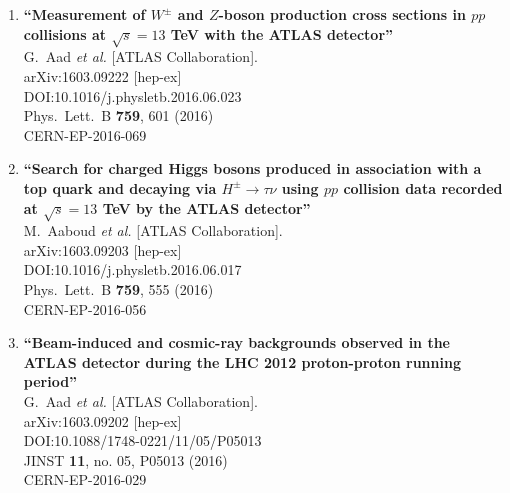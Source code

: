 \documentclass{article}
\begin{document}
\begin{enumerate}
\item%
{\bf ``Measurement of $W^{\pm}$ and $Z$-boson production cross sections in $pp$ collisions at $\sqrt{s}=13$ TeV with the ATLAS detector''}
  \\{}G.~Aad {\it et al.} [ATLAS Collaboration].
  \\{}arXiv:1603.09222 [hep-ex]
  \\{}DOI:10.1016/j.physletb.2016.06.023
  \\{}Phys.\ Lett.\ B {\bf 759}, 601 (2016)
  \\{}CERN-EP-2016-069
\item%
{\bf ``Search for charged Higgs bosons produced in association with a top quark and decaying via $H^{\pm} \rightarrow \tau\nu$ using $pp$ collision data recorded at $\sqrt{s} = 13$ TeV by the ATLAS detector''}
  \\{}M.~Aaboud {\it et al.} [ATLAS Collaboration].
  \\{}arXiv:1603.09203 [hep-ex]
  \\{}DOI:10.1016/j.physletb.2016.06.017
  \\{}Phys.\ Lett.\ B {\bf 759}, 555 (2016)
  \\{}CERN-EP-2016-056
\item%
{\bf ``Beam-induced and cosmic-ray backgrounds observed in the ATLAS detector during the LHC 2012 proton-proton running period''}
  \\{}G.~Aad {\it et al.} [ATLAS Collaboration].
  \\{}arXiv:1603.09202 [hep-ex]
  \\{}DOI:10.1088/1748-0221/11/05/P05013
  \\{}JINST {\bf 11}, no. 05, P05013 (2016)
  \\{}CERN-EP-2016-029


\end{enumerate}
\end{document}
